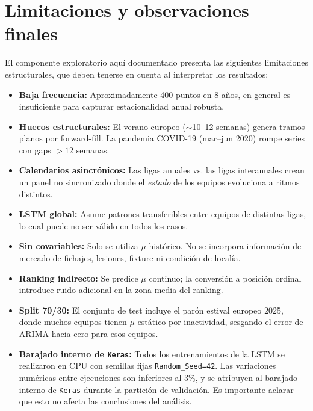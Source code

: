 \section{Limitaciones y observaciones finales}
\label{ap:limitaciones}

El componente exploratorio aqu\'i documentado presenta las siguientes limitaciones estructurales, que deben tenerse en cuenta al interpretar los resultados:

\begin{itemize}
	\item \textbf{Baja frecuencia:} Aproximadamente 400 puntos en 8 a\~nos, en general es insuficiente para capturar estacionalidad anual robusta.
	
	\item \textbf{Huecos estructurales:} El verano europeo (\(\sim\)10--12 semanas) genera tramos planos por forward-fill. La pandemia COVID-19 (mar--jun 2020) rompe series con gaps \(> 12\) semanas.
	
	\item \textbf{Calendarios asincr\'onicos:} Las ligas anuales vs. las ligas interanuales crean un panel no sincronizado donde el \textit{estado} de los equipos evoluciona a ritmos distintos.
	
	\item \textbf{LSTM global:} Asume patrones transferibles entre equipos de distintas ligas, lo cual puede no ser v\'alido en todos los casos.
	
	\item \textbf{Sin covariables:} Solo se utiliza \(\mu\) hist\'orico. No se incorpora informaci\'on de mercado de fichajes, lesiones, fixture ni condici\'on de local\'ia.
	
	\item \textbf{Ranking indirecto:} Se predice \(\mu\) continuo; la conversi\'on a posici\'on ordinal introduce ruido adicional en la zona media del ranking.
	
	\item \textbf{Split 70/30:} El conjunto de test incluye el par\'on estival europeo 2025, donde muchos equipos tienen \(\mu\) est\'atico por inactividad, sesgando el error de ARIMA hacia cero para esos equipos.
	
	\item \textbf{Barajado interno de \texttt{Keras}:} Todos los entrenamientos de la LSTM se realizaron en CPU con semillas fijas \texttt{Random\_Seed=42}. Las variaciones num\'ericas entre ejecuciones son inferiores al 3\%, y se atribuyen al barajado interno de \texttt{Keras} durante la partici\'on de validaci\'on. Es importante aclarar que esto no afecta las conclusiones del an\'alisis.
\end{itemize}

